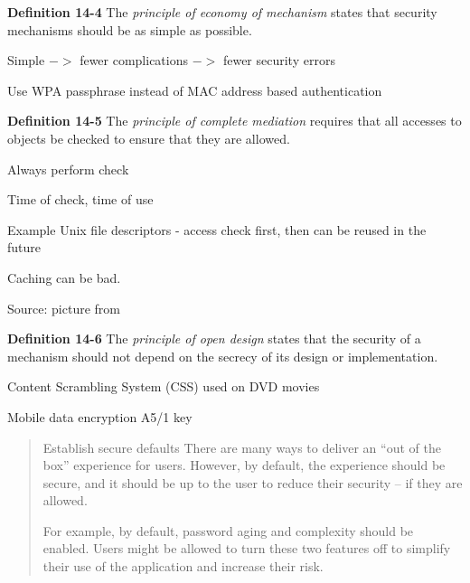 \documentclass[Screen16to9,17pt]{foils}
\begin{document}

\begin{list1}
\item {\bf Definition 14-4} The \emph{principle of economy of mechanism} states that security mechanisms should be as simple as possible.
\item Simple $->$ fewer complications $->$ fewer security errors
\item Use WPA passphrase instead of MAC address based authentication
\item
\end{list1}



\begin{list1}
\item {\bf Definition 14-5} The \emph{principle of complete mediation} requires that all accesses to objects be checked to ensure that they are allowed.
\item Always perform check
\item Time of check, time of use
\item Example Unix file descriptors - access check first, then can be reused in the future
\item Caching can be bad.
\end{list1}




Source: picture from 
\begin{list1}
\item {\bf Definition 14-6} The \emph{principle of open design} states that the security of a mechanism should not depend on the secrecy of its design or implementation.
\item Content Scrambling System (CSS) used on DVD movies
\item Mobile data encryption  A5/1 key
\end{list1}


\begin{quote}
Establish secure defaults
There are many ways to deliver an “out of the box” experience for users. However, by default, the experience should be secure, and it should be up to the user to reduce their security – if they are allowed.

For example, by default, password aging and complexity should be enabled. Users might be allowed to turn these two features off to simplify their use of the application and increase their risk.
\end{quote}
\end{document}
